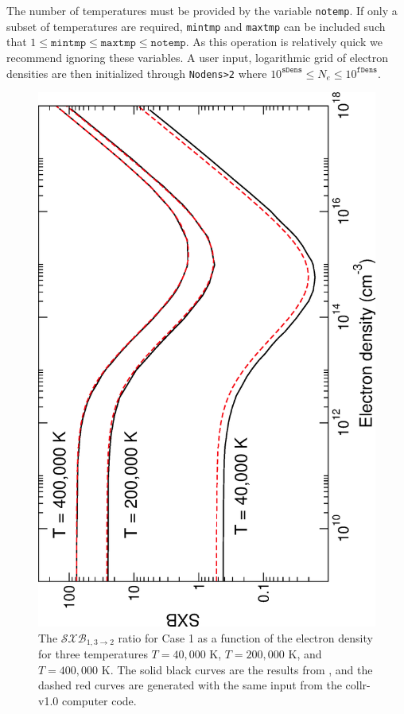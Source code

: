 The number of temperatures must be provided by the variable \texttt{notemp}. If only a subset of temperatures are required, \texttt{mintmp} and \texttt{maxtmp} can be included such that $1\le \texttt{mintmp} \le \texttt{maxtmp} \le \texttt{notemp}$. As this operation is relatively quick we recommend ignoring these variables. A user input, logarithmic grid of electron densities are then initialized through \texttt{Nodens>2} where $10^{\texttt{sDens}} \le N_e \le 10^{\texttt{fDens}}$.

%
\begin{figure}
\includegraphics[scale=0.55,angle=-90]{Figures/Spectral/comparison1.eps}
\caption{The $\mathcal{SXB}_{1,3\rightarrow 2}$ ratio for Case 1 as a function of the electron density for three temperatures $T=40,000$ K, $T=200,000$ K, and $T=400,000$ K. The solid black curves are the results from \citet{2007JPhB...40.4537G}, and the dashed red curves are generated with the same input from the {\sc collr-v1.0} computer code. \label{fig:spe_sxb1}}
\end{figure}
%

